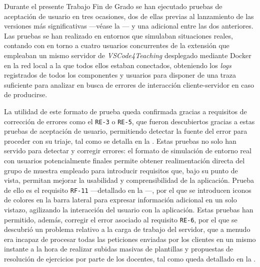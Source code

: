 Durante el presente Trabajo Fin de Grado se han ejecutado pruebas de aceptación de usuario en tres ocasiones, dos de ellas previas al lanzamiento de las versiones más significativas ---véase la --- y una adicional entre las dos anteriores. Las pruebas se han realizado en entornos que simulaban situaciones reales, contando con en torno a cuatro usuarios concurrentes de la extensión que empleaban un mismo servidor de \textit{VSCode4Teaching} desplegado mediante Docker en la red local a la que todos ellos estaban conectados, obteniendo los \textit{logs} registrados de todos los componentes y usuarios para disponer de una traza suficiente para analizar en busca de errores de interacción cliente-servidor en caso de producirse.

La utilidad de este formato de prueba queda confirmada gracias a requisitos de corrección de errores como el \texttt{RE-3} o \texttt{RE-5}, que fueron descubiertos gracias a estas pruebas de aceptación de usuario, permitiendo detectar la fuente del error para proceder con su triaje, tal como se detalla en la . Estas pruebas no solo han servido para detectar y corregir errores: el formato de simulación de entorno real con usuarios potencialmente finales permite obtener realimentación directa del grupo de muestra empleado para introducir requisitos que, bajo su punto de vista, permitan mejorar la usabilidad y comprensibilidad de la aplicación. Prueba de ello es el requisito \texttt{RF-11} ---detallado en la ---, por el que se introducen iconos de colores en la barra lateral para expresar información adicional en un solo vistazo, agilizando la interacción del usuario con la aplicación. Estas pruebas han permitido, además, corregir el error asociado al requisito \texttt{RE-6}, por el que se descubrió un problema relativo a la carga de trabajo del servidor, que a menudo era incapaz de procesar todas las peticiones enviadas por los clientes en un mismo instante a la hora de realizar subidas masivas de plantillas y propuestas de resolución de ejercicios por parte de los docentes, tal como queda detallado en la .
